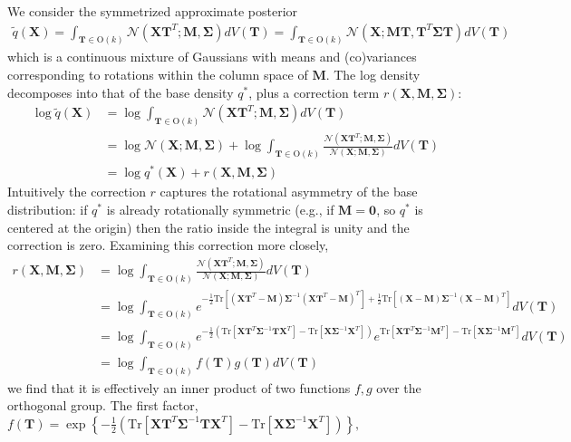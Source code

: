 \documentclass{article}
\newcommand{\N}{\mathcal{N}}
\newcommand{\Tr}{\text{Tr}}
\renewcommand{\O}{\text{O}}
\renewcommand{\v}[1]{\mathbf{#1}}
\begin{document}
We consider the symmetrized approximate posterior
\begin{align*}
\tilde{q}(\v{X}) = \int_{\v{T}\in \O(k)} \N(\v{X}\v{T}^T; \v{M}, \v{\Sigma}) dV(\v{T}) = \int_{\v{T}\in \O(k)} \N(\v{X}; \v{M}\v{T}, \v{T}^T \v{\Sigma} \v{T}) dV(\v{T})
\end{align*}
which is a continuous mixture of Gaussians with means and (co)variances
corresponding to rotations within the column space of $\v{M}$. The log
density decomposes into that of the base density $q^*$, plus a correction term $r(\v{X}, \v{M}, \v{\Sigma})$:
\begin{align}
\log \tilde{q}(\v{X}) &= \log \int_{\v{T}\in \O(k)} \N(\v{X}\v{T}^T; \v{M}, \v{\Sigma}) dV(\v{T})\nonumber\\
&=\log \N(\v{X}; \v{M}, \v{\Sigma}) + \log \int_{\v{T}\in \O(k)} \frac{\N(\v{X}\v{T}^T; \v{M}, \v{\Sigma})}{\N(\v{X}; \v{M}, \v{\Sigma} ) }  dV(\v{T})\nonumber\\
&=\log q^*(\v{X}) + r(\v{X}, \v{M}, \v{\Sigma})\label{eqn:symmetrized_orthog}
\end{align}
Intuitively the correction $r$ captures the rotational asymmetry of the
base distribution: if $q^*$ is already rotationally symmetric (e.g.,
if $\v{M}=\v{0}$, so $q^*$ is centered at the origin)
then the ratio inside the integral is unity and the correction is zero. Examining this correction more closely,
\begin{align*}
r(\v{X}, \v{M}, \v{\Sigma}) &= \log \int_{\v{T}\in \O(k)} \frac{\N(\v{X}\v{T}^T; \v{M}, \v{\Sigma})}{\N(\v{X}; \v{M}, \v{\Sigma} ) }  dV(\v{T})\\
&= \log \int_{\v{T}\in \O(k)} e^{-\frac{1}{2} \Tr \left[
  (\v{X}\v{T}^T-\v{M})\v{\Sigma}^{-1}(\v{X}\v{T}^T-\v{M})^T \right] + \frac{1}{2}\Tr \left[
  (\v{X}-\v{M})\v{\Sigma}^{-1}(\v{X}-\v{M})^T \right] }  dV(\v{T})\\
&= \log \int_{\v{T}\in \O(k)} e^{-\frac{1}{2} \left( \Tr \left[\v{X}\v{T}^T\v{\Sigma}^{-1}\v{T}\v{X}^T\right] - \Tr\left[\v{X}\v{\Sigma}^{-1}\v{X}^T\right]\right)}
  e^{\Tr\left[\v{X}\v{T}^T\v{\Sigma}^{-1}\v{M}^T \right] - \Tr\left[\v{X}\v{\Sigma}^{-1}\v{M}^T\right]} dV(\v{T})\\
&= \log \int_{\v{T}\in \O(k)} f(\v{T}) g(\v{T}) dV(\v{T})
\end{align*}
we find that it is effectively an inner product of two functions $f,g$
over the orthogonal group. The first factor, $f(\v{T}) = \exp\left\{-\frac{1}{2}
  \left( \Tr \left[\v{X}\v{T}^T\v{\Sigma}^{-1}\v{T}\v{X}^T\right] -
    \Tr\left[\v{X}\v{\Sigma}^{-1}\v{X}^T\right]\right)\right\},$
\end{document}
